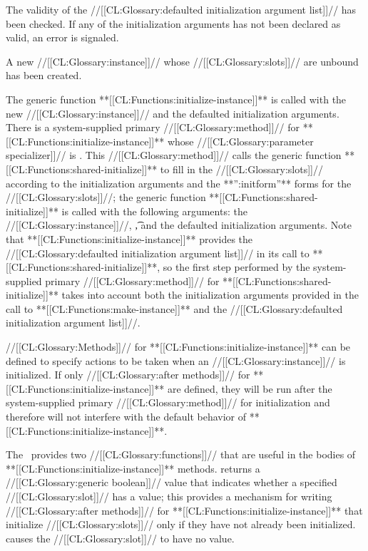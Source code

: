 \itemitem{\bull} The validity of the //[[CL:Glossary:defaulted initialization argument list]]// has been checked.  If any of the initialization arguments has not been declared as valid, an error is signaled. 

\itemitem{\bull} A new //[[CL:Glossary:instance]]// whose //[[CL:Glossary:slots]]//  are unbound has been created.

\endlist
                       The generic function **[[CL:Functions:initialize-instance]]** is called with the new //[[CL:Glossary:instance]]// and the defaulted initialization arguments.  There is a system-supplied primary //[[CL:Glossary:method]]// for **[[CL:Functions:initialize-instance]]** whose //[[CL:Glossary:parameter specializer]]// is .  This //[[CL:Glossary:method]]// calls the generic function  **[[CL:Functions:shared-initialize]]** to fill in the //[[CL:Glossary:slots]]// according to the initialization arguments and the  **'':initform''** forms for the //[[CL:Glossary:slots]]//; the generic function  **[[CL:Functions:shared-initialize]]** is called with the following arguments: the //[[CL:Glossary:instance]]//, \t, and the defaulted initialization arguments.
            Note that **[[CL:Functions:initialize-instance]]** provides the  //[[CL:Glossary:defaulted initialization argument list]]// in its call to **[[CL:Functions:shared-initialize]]**, so the first step performed by the system-supplied primary //[[CL:Glossary:method]]// for **[[CL:Functions:shared-initialize]]** takes into account both the initialization arguments provided in the call to **[[CL:Functions:make-instance]]** and the //[[CL:Glossary:defaulted initialization argument list]]//.

//[[CL:Glossary:Methods]]// for **[[CL:Functions:initialize-instance]]** can be defined to specify actions to be taken when an //[[CL:Glossary:instance]]// is initialized.   If only //[[CL:Glossary:after methods]]// for **[[CL:Functions:initialize-instance]]** are defined, they will be run after the system-supplied primary //[[CL:Glossary:method]]// for initialization and therefore will not interfere with the default behavior of  **[[CL:Functions:initialize-instance]]**.

The \OS\ provides two //[[CL:Glossary:functions]]// that are useful in the bodies of  **[[CL:Functions:initialize-instance]]** methods.   returns a //[[CL:Glossary:generic boolean]]// value that indicates whether a specified //[[CL:Glossary:slot]]// has a value; this provides a mechanism for writing //[[CL:Glossary:after methods]]// for **[[CL:Functions:initialize-instance]]** that initialize //[[CL:Glossary:slots]]// only if they have not already been initialized.   causes the //[[CL:Glossary:slot]]// to have no value.

